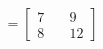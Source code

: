 \documentclass[preview]{standalone}
\begin{document}
\begin{align*}
=\begin{bmatrix} 7 & \quad 9 \\ 8 & \quad 12 \end{bmatrix}
\end{align*}
\end{document}
